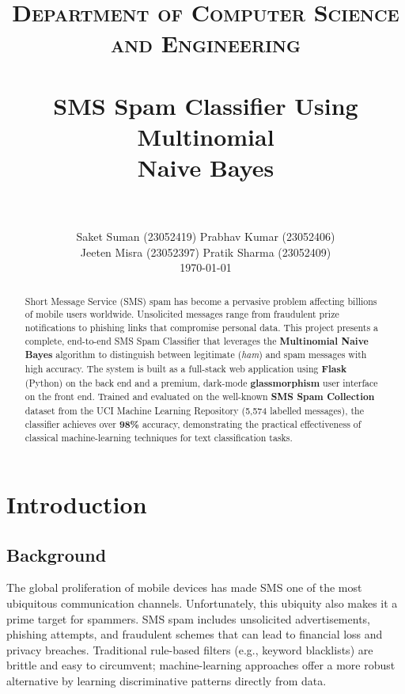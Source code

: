 \documentclass[paper=a4, fontsize=11pt]{scrartcl}
\title{
    \usefont{OT1}{bch}{b}{n}
    \normalfont \normalsize \textsc{Department of Computer Science and Engineering} \\ [15pt]
    \horrule{0.5pt} \\[0.4cm]
    \huge SMS Spam Classifier Using Multinomial\\Naive Bayes \\
    \horrule{2pt} \\[0.5cm]
}
\author{
    \normalfont \normalsize
    Saket Suman (23052419) \quad Prabhav Kumar (23052406)\\[6pt]
    \normalsize
    Jeeten Misra (23052397) \quad Pratik Sharma (23052409)\\[10pt]
    \normalsize
    \today
}
\date{}
\numberwithin{equation}{section}
\numberwithin{figure}{section}
\numberwithin{table}{section}
\begin{document}
\maketitle

\begin{abstract}
Short Message Service (SMS) spam has become a pervasive problem affecting billions of mobile users worldwide. Unsolicited messages range from fraudulent prize notifications to phishing links that compromise personal data. This project presents a complete, end-to-end SMS Spam Classifier that leverages the \textbf{Multinomial Naive Bayes} algorithm to distinguish between legitimate (\textit{ham}) and spam messages with high accuracy. The system is built as a full-stack web application using \textbf{Flask} (Python) on the back end and a premium, dark-mode \textbf{glassmorphism} user interface on the front end. Trained and evaluated on the well-known \textbf{SMS Spam Collection} dataset from the UCI Machine Learning Repository (5,574 labelled messages), the classifier achieves over \textbf{98\%} accuracy, demonstrating the practical effectiveness of classical machine-learning techniques for text classification tasks.
\end{abstract}



\section{Introduction}

\subsection{Background}
The global proliferation of mobile devices has made SMS one of the most ubiquitous communication channels.  Unfortunately, this ubiquity also makes it a prime target for spammers.  SMS spam includes unsolicited advertisements, phishing attempts, and fraudulent schemes that can lead to financial loss and privacy breaches.  Traditional rule-based filters (e.g., keyword blacklists) are brittle and easy to circumvent; machine-learning approaches offer a more robust alternative by learning discriminative patterns directly from data.
\end{document}
